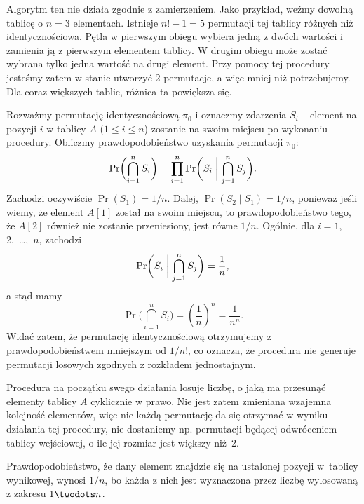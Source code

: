 \exercise{} %
\bigskip

\noindent Algorytm ten nie działa zgodnie z zamierzeniem. Jako przykład, weźmy dowolną tablicę o $n=3$ elementach. Istnieje $n!-1=5$ permutacji tej tablicy różnych niż identycznościowa. Pętla  w pierwszym obiegu wybiera jedną z dwóch wartości i zamienia ją z pierwszym elementem tablicy. W drugim obiegu może zostać wybrana tylko jedna wartość na drugi element. Przy pomocy tej procedury jesteśmy zatem w stanie utworzyć 2 permutacje, a więc mniej niż potrzebujemy. Dla coraz większych tablic, różnica ta powiększa się.

\exercise{} %
Rozważmy permutację identycznościową $\pi_0$ i oznaczmy zdarzenia $S_i$ -- element na pozycji $i$ w tablicy $A$ ($1\le i\le n$) zostanie na swoim miejscu po wykonaniu procedury. Obliczmy prawdopodobieństwo uzyskania permutacji $\pi_0$:
\[
	\Pr\biggl(\bigcap_{i=1}^nS_i\biggr) = \prod_{i=1}^n\Pr\biggl(S_i\biggm|\bigcap_{j=1}^nS_j\biggr).
\]
Zachodzi oczywiście $\Pr(S_1)=1/n$. Dalej, $\Pr(S_2\mid S_1)=1/n$, ponieważ jeśli wiemy, że element $A[1]$ został na swoim miejscu, to prawdopodobieństwo tego, że $A[2]$ również nie zostanie przeniesiony, jest równe $1/n$. Ogólnie, dla $i=1$, 2,~\dots,~$n$, zachodzi
\[
	\Pr\biggl(S_i\biggm|\bigcap_{j=1}^nS_j\biggr) = \frac{1}{n},
\]
a stąd mamy
\[
	\Pr\biggl(\bigcap_{i=1}^nS_i\biggr) = \left(\frac{1}{n}\right)^n = \frac{1}{n^n}.
\]
Widać zatem, że permutację identycznościową otrzymujemy z prawdopodobieństwem mniejszym od $1/n!$, co oznacza, że procedura  nie generuje permutacji losowych zgodnych z rozkładem jednostajnym.

\exercise{} %
Procedura na początku swego działania losuje liczbę, o jaką ma przesunąć elementy tablicy $A$ cyklicznie w prawo. Nie jest zatem zmieniana wzajemna kolejność elementów, więc nie każdą permutację da się otrzymać w wyniku działania tej procedury, nie dostaniemy np. permutacji będącej odwróceniem tablicy wejściowej, o ile jej rozmiar jest większy niż~2.

Prawdopodobieństwo, że dany element znajdzie się na ustalonej pozycji w~tablicy wynikowej, wynosi $1/n$, bo każda z nich jest wyznaczona przez liczbę wylosowaną z zakresu $1\twodots n$.

